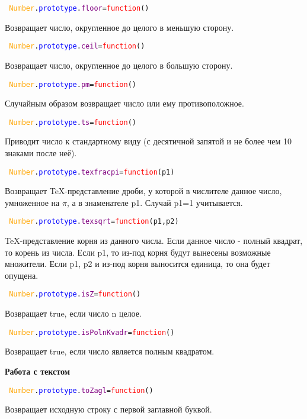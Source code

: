 \texttt{
	\textcolor{Orange}{Number}.\textcolor{Blue}{prototype}.\textcolor{Purple}{floor}=\textcolor{Red}{function}()
}

Возвращает число, округленное до целого в меньшую сторону.

\texttt{
	\textcolor{Orange}{Number}.\textcolor{Blue}{prototype}.\textcolor{Purple}{ceil}=\textcolor{Red}{function}()
}

Возвращает число, округленное до целого в большую сторону.

\texttt{
	\textcolor{Orange}{Number}.\textcolor{Blue}{prototype}.\textcolor{Purple}{pm}=\textcolor{Red}{function}()
}

Случайным образом возвращает число или ему противоположное.

\texttt{
	\textcolor{Orange}{Number}.\textcolor{Blue}{prototype}.\textcolor{Purple}{ts}=\textcolor{Red}{function}()
}

Приводит число к стандартному виду (с десятичной запятой и не более чем 10 знаками после неё).

\texttt{
	\textcolor{Orange}{Number}.\textcolor{Blue}{prototype}.\textcolor{Purple}{texfracpi}=\textcolor{Red}{function}(p1)
}

Возвращает TeX-представление дроби, у которой в числителе данное число, умноженное на $\pi$, а в знаменателе p1.
Случай p1=1 учитывается.

\texttt{
	\textcolor{Orange}{Number}.\textcolor{Blue}{prototype}.\textcolor{Purple}{texsqrt}=\textcolor{Red}{function}(p1,p2)
}

TeX-представление корня из данного числа.
Если данное число - полный квадрат, то корень из числа.
Если p1, то из-под корня будут вынесены возможные множители.
Если p1, p2 и из-под корня выносится единица, то она будет опущена.

\texttt{
	\textcolor{Orange}{Number}.\textcolor{Blue}{prototype}.\textcolor{Purple}{isZ}=\textcolor{Red}{function}()
}

Возвращает true, если число n целое.

\texttt{
	\textcolor{Orange}{Number}.\textcolor{Blue}{prototype}.\textcolor{Purple}{isPolnKvadr}=\textcolor{Red}{function}()
}

Возвращает true, если число является полным квадратом.

\textbf{Работа с текстом}

\texttt{
	\textcolor{Orange}{Number}.\textcolor{Blue}{prototype}.\textcolor{Purple}{toZagl}=\textcolor{Red}{function}()
}

Возвращает исходную строку с первой заглавной буквой.

